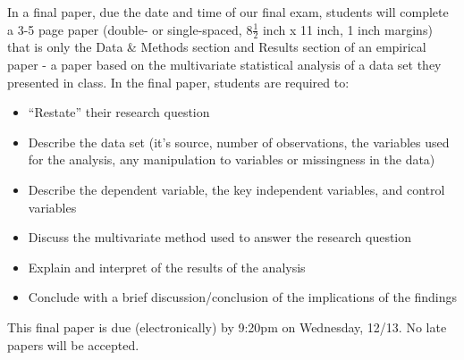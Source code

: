 \documentclass{article}
\begin{document}
In a final paper, due the date and time of our final exam, students will complete a 3-5 page paper (double- or single-spaced, 8$\frac{1}{2}$ inch x 11 inch, 1 inch margins) that is only the Data \& Methods section and Results section of an empirical paper - a paper based on the multivariate statistical analysis of a data set they presented in class. In the final paper, students are required to: \\
\begin{itemize}
\item ``Restate'' their research question
\item Describe the data set (it's source, number of observations, the variables used for the analysis, any manipulation to variables or missingness in the data)
\item Describe the dependent variable, the key independent variables, and control variables
\item Discuss the multivariate method used to answer the research question
\item Explain and interpret of the results of the analysis
\item Conclude with a brief discussion/conclusion of the implications of the findings
\end{itemize}

This final paper is due (electronically) by 9:20pm on Wednesday, 12/13. No late papers will be accepted. \newline
\end{document}
